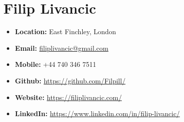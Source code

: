 \documentclass[a4paper,9pt]{article}
\date{}
\begin{document}
\section*{Filip Livancic}

\begin{itemize}[noitemsep]
    \item[] \faMapO \hspace{1mm} \textbf{Location:} \hspace{0.2mm}East Finchley, London
    \item[] \faEnvelope \hspace{1.6mm} \textbf{Email:} \hspace{3.5mm} \href{mailto:filiplivancic@gmail.com}{filiplivancic@gmail.com}
    \item[] \faPhone \hspace{2.2mm} \textbf{Mobile:} \hspace{1.5mm} +44 740 346 7511
    \item[] \faGithub \hspace{2mm} \textbf{Github:} \hspace{1.8mm} \url{https://github.com/Filpill/}
    \item[] \faGlobe \hspace{2mm} \textbf{Website:} \hspace{0.5mm} \url{https://filiplivancic.com/}
    \item[] \faLinkedinSquare \hspace{2mm} \textbf{LinkedIn:} \hspace{0mm}\url{https://www.linkedin.com/in/filip-livancic/}
\end{itemize}
\end{document}
